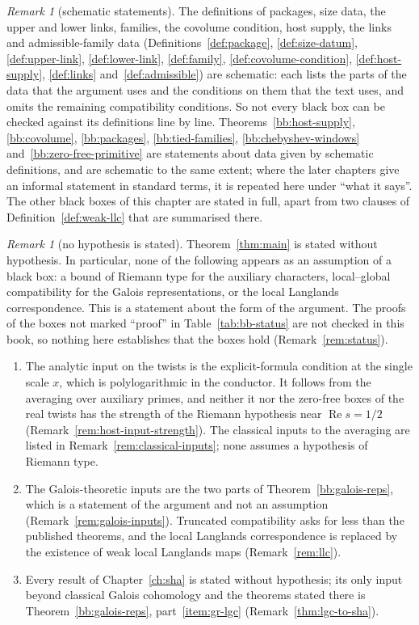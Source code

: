 \documentclass[11pt]{amsbook}
\theoremstyle{plain}
\theoremstyle{definition}
\theoremstyle{remark}
\newtheorem{remark}[theorem]{Remark}
\numberwithin{equation}{section}
\numberwithin{figure}{chapter}
\numberwithin{table}{chapter}
\begin{document}
\begin{remark}[schematic statements]\label{rem:bb-schematic}
The definitions of packages, size data, the upper and lower links,
families, the covolume condition, host supply, the links and
admissible-family data
(Definitions~\ref{def:package}, \ref{def:size-datum},
\ref{def:upper-link}, \ref{def:lower-link}, \ref{def:family},
\ref{def:covolume-condition}, \ref{def:host-supply},
\ref{def:links} and~\ref{def:admissible}) are schematic: each lists
the parts of the data that the argument uses and the conditions on
them that the text uses, and omits the remaining compatibility
conditions. So not every black box can be checked against its
definitions line by line. Theorems~\ref{bb:host-supply},
\ref{bb:covolume},
\ref{bb:packages}, \ref{bb:tied-families},
\ref{bb:chebyshev-windows} and~\ref{bb:zero-free-primitive} are
statements about data given by schematic definitions, and are
schematic to the same extent; where the later chapters give an
informal statement in standard terms, it is repeated here under
``what it says''. The other black boxes of this chapter are stated
in full, apart from two clauses of Definition~\ref{def:weak-llc}
that are summarised there.
\end{remark}

\begin{remark}[no hypothesis is stated]\label{rem:bb-unconditional}
Theorem~\ref{thm:main} is stated without hypothesis. In particular,
none of the following appears as an assumption of a black box: a
bound of Riemann type for the auxiliary characters, local--global
compatibility for the Galois representations, or the local Langlands
correspondence. This is a statement about the form of the argument. The
proofs of the boxes not marked ``proof'' in
Table~\ref{tab:bb-status} are not checked in this book, so nothing
here establishes that the boxes hold (Remark~\ref{rem:status}).
\begin{enumerate}[label=(\arabic*)]
\item The analytic input on the twists is the explicit-formula
condition at the single scale $x$, which is polylogarithmic in the
conductor. It follows from the averaging over auxiliary primes, and
neither it nor the zero-free boxes of the real twists has the
strength of the Riemann hypothesis near $\operatorname{Re}s=1/2$
(Remark~\ref{rem:host-input-strength}). The classical inputs to the
averaging are listed in Remark~\ref{rem:classical-inputs}; none
assumes a hypothesis of Riemann type.
\item The Galois-theoretic inputs are the two parts of
Theorem~\ref{bb:galois-reps}, which is a statement of the argument
and not an assumption (Remark~\ref{rem:galois-inputs}). Truncated
compatibility asks for less than the published theorems, and the
local Langlands correspondence is replaced by the existence of weak
local Langlands maps (Remark~\ref{rem:llc}).
\item Every result of Chapter~\ref{ch:sha} is stated without
hypothesis; its only input beyond classical Galois cohomology and
the theorems stated there is Theorem~\ref{bb:galois-reps},
part~\ref{item:gr-lgc} (Remark~\ref{thm:lgc-to-sha}).
\end{enumerate}
\end{remark}
\end{document}
